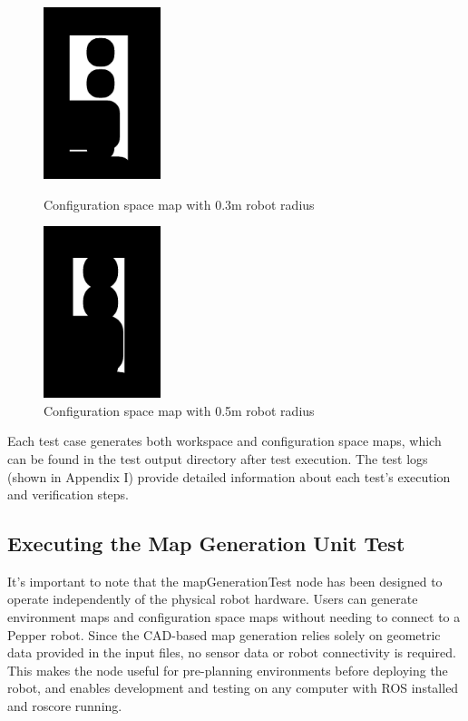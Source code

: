 \documentclass{CSSRforAfrica}
\begin{document}
\begin{figure}[H]
  \centering
  \begin{minipage}{0.45\textwidth}
    \centering
    \includegraphics[width=\linewidth,height=5cm,keepaspectratio]{images/configurationMap0.3.png}
    \caption{Configuration space map with 0.3m robot radius}
    \label{fig:config_space_0.3m}
  \end{minipage}
  \hfill
  \begin{minipage}{0.45\textwidth}
    \centering
    \includegraphics[width=\linewidth,height=5cm,keepaspectratio]{images/configurationMap0.5.png}
    \caption{Configuration space map with 0.5m robot radius}
    \label{fig:config_space_0.5m}
  \end{minipage}
\end{figure}

\noindent Each test case generates both workspace and configuration space maps, which can be found in the test output directory after test execution. The test logs (shown in Appendix I) provide detailed information about each test's execution and verification steps.
\newpage
\subsection{Executing the Map Generation Unit Test}

It's important to note that the mapGenerationTest node has been designed to operate independently of the physical robot hardware. Users can generate environment maps and configuration space maps without needing to connect to a Pepper robot. Since the CAD-based map generation relies solely on geometric data provided in the input files, no sensor data or robot connectivity is required. This makes the node useful for pre-planning environments before deploying the robot, and enables development and testing on any computer with ROS installed and roscore running.
\end{document}

